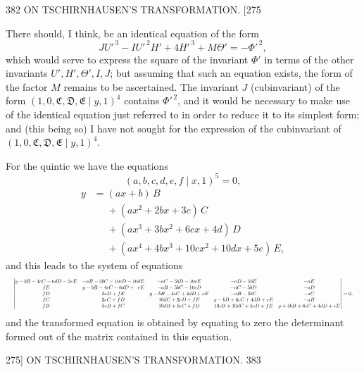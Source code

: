 \documentclass[11pt]{article}
\begin{document}
\begin{center}
382 \hfill ON TSCHIRNHAUSEN'S TRANSFORMATION. \hfill \textsc{[275}
\end{center}

There should, I think, be an identical equation of the form
\[ JU'^{\,3}-IU'^{\,2}H'+4H'^{\,3}+M\Theta'=-\Phi'^{\,2}, \]
which would serve to express the square of the invariant $\Phi'$ in terms of the other
invariants $U',H',\Theta',I,J$; but assuming that such an equation exists, the form of
the factor $M$ remains to be ascertained. The invariant $J$ (cubinvariant) of the form
$(1,0,\mathfrak{C},\mathfrak{D},\mathfrak{E} \mid y,1)^{4}$ contains $\Phi'^{\,2}$, and it would be necessary
to make use of the identical equation just referred to in order to reduce it to its
simplest form; and (this being so) I have not sought for the expression of the
cubinvariant of $(1,0,\mathfrak{C},\mathfrak{D},\mathfrak{E} \mid y,1)^{4}$.

For the quintic we have the equations
\[ (a,b,c,d,e,f \mid x,1)^{5}=0, \]
\begin{align*}
y &= (ax+b)\,B \\
  &\phantom{=} +(ax^{2}+2bx+3c)\,C \\
  &\phantom{=} +(ax^{3}+3bx^{2}+6cx+4d)\,D \\
  &\phantom{=} +(ax^{4}+4bx^{3}+10cx^{2}+10dx+5e)\,E,
\end{align*}
and this leads to the system of equations
\[ \resizebox{\textwidth}{!}{$\displaystyle
\begin{vmatrix}
y-bB-4cC-6dD-5eE & -aB-5bC-10cD-10dE & -aC-5bD-10cE & -aD-5bE & -aE \\
fE & y-bB-4cC-6dD+\phantom{0}eE & -aB-5bC-10cD & -aC-5bD & -aD \\
fD & 5eD+fE & y-bB-4cC+4dD+eE & -aB-5bC & -aC \\
fC & 5eC+fD & 10dC+5eD+fE & y-bB+6cC+4dD+eE & -aB \\
fB & 5eB+fC & 10dB+5eC+fD & 10cB+10dC+5eD+fE & y+4bB+6cC+4dD+eE
\end{vmatrix}=0,
$} \]
and the transformed equation is obtained by equating to zero the determinant formed
out of the matrix contained in this equation.

\begin{center}
\textsc{275]} \hfill ON TSCHIRNHAUSEN'S TRANSFORMATION. \hfill 383
\end{center}
\end{document}
